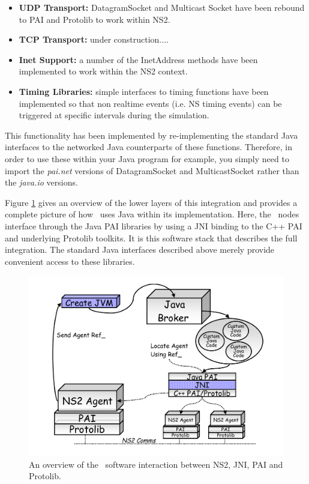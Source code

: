 \begin{itemize}
\item \textbf{UDP Transport:} DatagramSocket and Multicast Socket have been 
rebound to PAI and Protolib to work within NS2.
\item \textbf{TCP Transport:} under construction....
\item \textbf{Inet Support:} a number of the InetAddress methods have been
implemented to work within the NS2 context.
\item \textbf{Timing Libraries:} simple interfaces to timing functions have been 
implemented so that non realtime events (i.e. NS timing events) can be triggered 
at specific intervals during the simulation.
\end{itemize}

This functionality has been implemented by re-implementing the standard Java
interfaces to the networked Java counterparts of these functions. Therefore, in
order to use these within your Java program for example, you simply need to 
import the \emph{pai.net} versions of DatagramSocket and MulticastSocket
rather than the \emph{java.io} versions.


Figure \ref{agentj:fig:javaFullOverview} gives an overview of the lower layers
of this integration and provides a complete picture of how \agentj~uses Java 
within its implementation.  Here, the \agentj~nodes interface through the
Java PAI libraries by using a JNI binding to the C++ PAI and underlying 
Protolib toolkits. It is this software stack that describes the full integration.  
The standard Java interfaces described above merely provide convenient 
access to these libraries.

\begin{figure}
\centering
\includegraphics[scale=0.40]{images/agentjFullOverview}
\caption{An overview of the \agentj~software interaction between 
NS2, JNI, PAI and Protolib.} 
\label{agentj:fig:javaFullOverview}
\end{figure}

